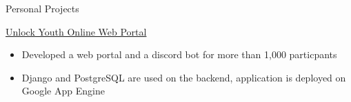 \documentclass{article}
\newlength{\tabin}
\newlength{\secsep}
\newcommand{\lineunder}{\vspace*{-8pt} \\ \hspace*{-6pt} \hrulefill \\ \vspace*{-15pt}}
\newenvironment{tabbedsection}[1]{
  \begin{list}{}{
      \setlength{\itemsep}{0pt}
      \setlength{\labelsep}{0pt}
      \setlength{\labelwidth}{0pt}
      \setlength{\leftmargin}{\tabin}
      \setlength{\rightmargin}{\tabin}
      \setlength{\listparindent}{0pt}
      \setlength{\parsep}{0pt}
      \setlength{\parskip}{0pt}
      \setlength{\partopsep}{0pt}
      \setlength{\topsep}{#1}
    }
  \item[]
}{\end{list}}
\newenvironment{resume_section}[1]{
  \filbreak
  \vspace{2\secsep}
  \textsc{\large#1}
  \lineunder
  \begin{tabbedsection}{\secsep}
}{\end{tabbedsection}}
\newenvironment{resume_subsection}[2][]{
  \textbf{#2} \hfill {\footnotesize #1} \hspace{2em}
  \begin{tabbedsection}{0.5\secsep}
}{\end{tabbedsection}}
\newenvironment{subitems}{
  \renewcommand{\labelitemi}{-}
  \begin{itemize}
      \setlength{\labelsep}{1em}
}{\end{itemize}}
\begin{document}
\begin{resume_section}{Personal Projects}

  \begin{resume_subsection}{\href{https://github.com/marcustut/UnlockProject}{Unlock Youth Online Web Portal}}
    \begin{subitems}
      \item Developed a web portal and a discord bot for more than 1,000 particpants
      \item Django and PostgreSQL are used on the backend, application is deployed on Google App Engine
    \end{subitems}
  \end{resume_subsection}
\end{resume_section}
\end{document}
